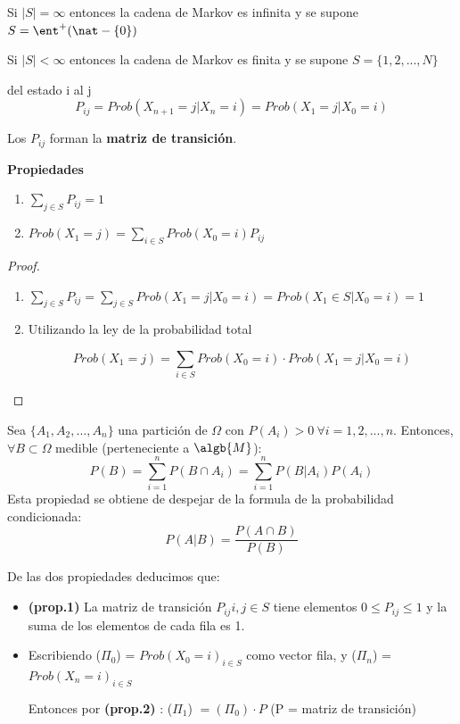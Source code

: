 Si $|S| = \infty$ entonces la cadena de Markov es infinita y se supone $S = \ent^+ (\nat -\{0\})$


Si $|S| < \infty$ entonces la cadena de Markov es finita y se supone $S =\{1,2,...,N\}$

\begin{defn}
	del estado i al j
	$$P_{ij} = Prob(X_{n+1} = j| X_n = i) = Prob (X_1 = j| X_0 = i)$$
\end{defn}

Los $P_{ij}$ forman la \textbf{matriz de transición}.

\newpage
\textbf{Propiedades}
\begin{enumerate}
	\item $\sum_{j \in S} P_{ij} = 1$
	\item $Prob(X_1 = j)= \sum_{i \in S} Prob(X_0 = i)P_{ij}$\\
\end{enumerate}

\begin{proof}
	\begin{enumerate}
		\item $\sum_{j \in S} P_{ij} = \sum_{j\in S} Prob(X_1 = j | X_0 = i) = Prob (X_1 \in S | X_0 = i) = 1$
		\item Utilizando la ley de la probabilidad total

		$$Prob(X_1 = j) = \sum_{i \in S} Prob (X_0 = i) \cdot Prob(X_1 = j| X_0 = i)$$
	\end{enumerate}
\end{proof}

	\begin{defn}
		Sea  $\{A_1, A_2,...,A_n\}$ una partición de $\Omega$ con $P(A_i)>0 \ \forall i=1,2,...,n$. Entonces, $\forall B \subset \Omega$ medible (perteneciente a $\algb{M}$):
		\[
		P(B)=\sum_{i=1}^{n}P(B\cap A_i)=\sum_{i=1}^{n}P(B|A_i)P(A_i)
		\]
		Esta propiedad se obtiene de despejar de la formula de la probabilidad condicionada:
		\[P(A|B)=\frac{P(A \cap B)}{P(B)}\]
	\end{defn}


De las dos propiedades deducimos que:
\begin{itemize}
	\item \textbf{(prop.1)} La matriz de transición $P_{ij} i,j \in S$ tiene elementos $0 \leq P_{ij} \leq 1$ y la suma de los elementos de cada fila es 1.
	\item Escribiendo ($\Pi_0$) = ${Prob (X_0 =i)}_{i \in S}$ como vector fila, y ($\Pi_n$) = ${Prob (X_n =i)}_{i \in S}$

	Entonces por \textbf{(prop.2)} : ($\Pi_1$) $ = (\Pi_0)\cdot P$ (P = matriz de transición)
\end{itemize}

